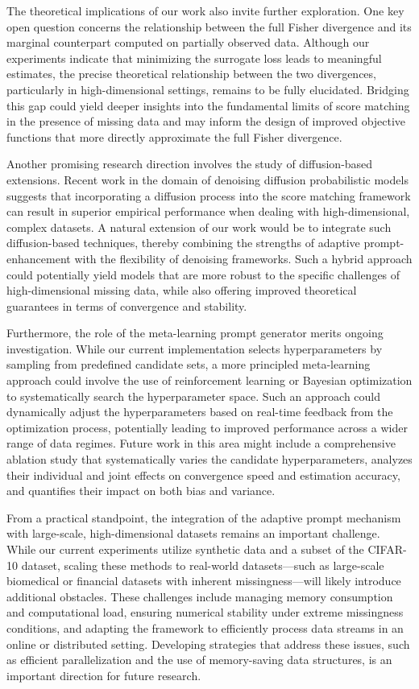 \documentclass{article}
\begin{document}
The theoretical implications of our work also invite further exploration. One key open question concerns the relationship between the full Fisher divergence and its marginal counterpart computed on partially observed data. Although our experiments indicate that minimizing the surrogate loss leads to meaningful estimates, the precise theoretical relationship between the two divergences, particularly in high-dimensional settings, remains to be fully elucidated. Bridging this gap could yield deeper insights into the fundamental limits of score matching in the presence of missing data and may inform the design of improved objective functions that more directly approximate the full Fisher divergence.

Another promising research direction involves the study of diffusion-based extensions. Recent work in the domain of denoising diffusion probabilistic models suggests that incorporating a diffusion process into the score matching framework can result in superior empirical performance when dealing with high-dimensional, complex datasets. A natural extension of our work would be to integrate such diffusion-based techniques, thereby combining the strengths of adaptive prompt-enhancement with the flexibility of denoising frameworks. Such a hybrid approach could potentially yield models that are more robust to the specific challenges of high-dimensional missing data, while also offering improved theoretical guarantees in terms of convergence and stability.

Furthermore, the role of the meta-learning prompt generator merits ongoing investigation. While our current implementation selects hyperparameters by sampling from predefined candidate sets, a more principled meta-learning approach could involve the use of reinforcement learning or Bayesian optimization to systematically search the hyperparameter space. Such an approach could dynamically adjust the hyperparameters based on real-time feedback from the optimization process, potentially leading to improved performance across a wider range of data regimes. Future work in this area might include a comprehensive ablation study that systematically varies the candidate hyperparameters, analyzes their individual and joint effects on convergence speed and estimation accuracy, and quantifies their impact on both bias and variance.

From a practical standpoint, the integration of the adaptive prompt mechanism with large-scale, high-dimensional datasets remains an important challenge. While our current experiments utilize synthetic data and a subset of the CIFAR-10 dataset, scaling these methods to real-world datasets—such as large-scale biomedical or financial datasets with inherent missingness—will likely introduce additional obstacles. These challenges include managing memory consumption and computational load, ensuring numerical stability under extreme missingness conditions, and adapting the framework to efficiently process data streams in an online or distributed setting. Developing strategies that address these issues, such as efficient parallelization and the use of memory-saving data structures, is an important direction for future research.
\end{document}
